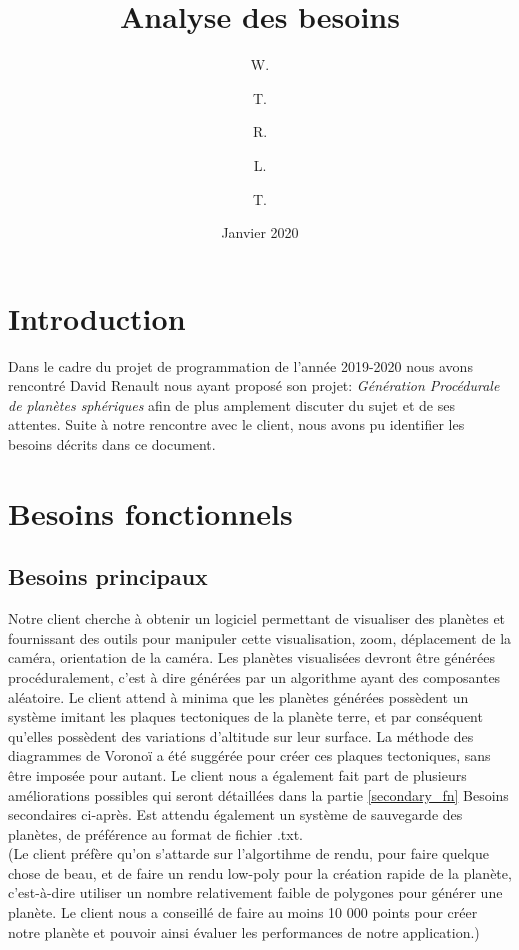 \documentclass{article}
\title{Analyse des besoins}
\author{W.\bsc{Daigremont}
\and 
T.\bsc{Guesdon}
\and
R.\bsc{Montferme}
\and
L.\bsc{Souvay}
\and
T.\bsc{Videau}}
\date{Janvier 2020}
\begin{document}
\nocite{*}
\maketitle
\tableofcontents

\section{Introduction}\label{introduction}
Dans le cadre du projet de programmation de l'année 2019-2020 nous avons rencontré David Renault nous ayant proposé son projet: \textit{Génération Procédurale de planètes sphériques} afin de plus amplement discuter du sujet et de ses attentes. \newline
Suite à notre rencontre avec le client, nous avons pu identifier les besoins décrits dans ce document.

\section{Besoins fonctionnels}\label{functionnal_needs}

\subsection{Besoins principaux}\label{primary_fn}
Notre client cherche à obtenir un logiciel permettant de visualiser des planètes et fournissant des outils pour manipuler cette visualisation, zoom, déplacement de la caméra, orientation de la caméra. Les planètes visualisées devront être générées procéduralement, c'est à dire générées par un algorithme ayant des composantes aléatoire. Le client attend à minima que les planètes générées possèdent un système imitant les plaques tectoniques de la planète terre, et par conséquent qu'elles possèdent des variations d'altitude sur leur surface. La méthode des diagrammes de Voronoï a été suggérée pour créer ces plaques tectoniques, sans être imposée pour autant. Le client nous a également fait part de plusieurs améliorations possibles qui seront détaillées dans la partie \ref{secondary_fn} Besoins secondaires ci-après. Est attendu également un système de sauvegarde des planètes, de préférence au format de fichier .txt.\\
(Le client préfère qu'on s'attarde sur l'algortihme de rendu, pour faire quelque chose de beau, et de faire un rendu low-poly pour la création rapide de la planète, c'est-à-dire utiliser un nombre relativement faible de polygones pour générer une planète. Le client nous a conseillé de faire au moins 10 000 points pour créer notre planète et pouvoir ainsi évaluer les performances de notre application.)
\end{document}
